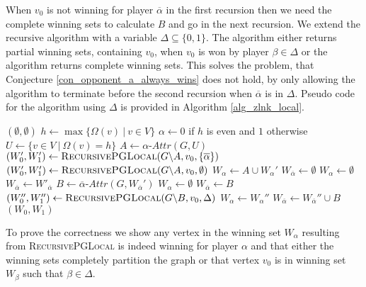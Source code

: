 When $v_0$ is not winning for player $\overline{\alpha}$ in the first recursion then we need the complete winning sets to calculate $B$ and go in the next recursion. We extend the recursive algorithm with a variable $\Delta \subseteq \{0,1\}$. The algorithm either returns partial winning sets, containing $v_0$, when $v_0$ is won by player $\beta\in \Delta$ or the algorithm returns complete winning sets. This solves the problem, that Conjecture \ref{con_opponent_a_always_wins} does not hold, by only allowing the algorithm to terminate before the second recursion when $\overline{\alpha}$ is in $\Delta$. Pseudo code for the algorithm using $\Delta$ is provided in Algorithm \ref{alg_zlnk_local}.
\begin{algorithm}
	\caption{$\textsc{RecursivePGLocal}(\textit{parity game } G = (V,V_0,V_1, E, \Omega),v_0,\Delta)$}
	\label{alg_zlnk_local}
	\begin{algorithmic}[1]
			\State \Return $(\emptyset, \emptyset)$
		\EndIf
		\State $h \gets\max\{ \Omega(v)\ |\ v \in V\}$
		\State $\alpha \gets 0$ if $h$ is even and $1$ otherwise
		\State $U \gets \{v \in V\ |\ \Omega(v) = h\}$
		\State $A \gets \alpha\textit{-Attr}(G, U)$
		\If{$\overline{\alpha} \in \Delta$}\label{line:recursivePGLocal:firstif}
		\State $(W_0', W_1') \gets \textsc{RecursivePGLocal}(G \backslash A,v_0,\{\overline{\alpha}\})$
		\Else
		\State $(W_0', W_1') \gets \textsc{RecursivePGLocal}(G \backslash A,v_0,\emptyset)$
		\EndIf
		\label{line:recursivePGLocal:emptywinif}
		\State $W_\alpha \gets A \cup W_\alpha'$
		\State $W_{\overline{\alpha}} \gets \emptyset$
		\Else
		\label{line:recursivePGLocal:v0inWopponentalpha}
		\State $W_\alpha \gets \emptyset$
		\State $W_{\overline{\alpha}} \gets W'_{\overline{\alpha}}$
		\Else
		\State $B \gets \overline{\alpha}\textit{-Attr}(G,W_{\overline{\alpha}}')$
		\label{line:recursivePGLocal:v0inB}
		\State $W_\alpha \gets \emptyset$
		\State $W_{\overline{\alpha}} \gets B$
		\Else
		\State $(W_0'', W_1'') \gets \textsc{RecursivePGLocal}(G \backslash B,v_0,\Delta)$
		\State $W_\alpha \gets W_\alpha''$
		\State $W_{\overline{\alpha}} \gets W_{\overline{\alpha}}'' \cup B$
		\EndIf
		\EndIf
		\EndIf
		\State \Return $(W_0, W_1)$
	\end{algorithmic}
\end{algorithm}

To prove the correctness we show any vertex in the winning set $W_\alpha$ resulting from \textsc{RecursivePGLocal} is indeed winning for player $\alpha$ and that either the winning sets completely partition the graph or that vertex $v_0$ is in winning set $W_\beta$ such that $\beta \in \Delta$.

